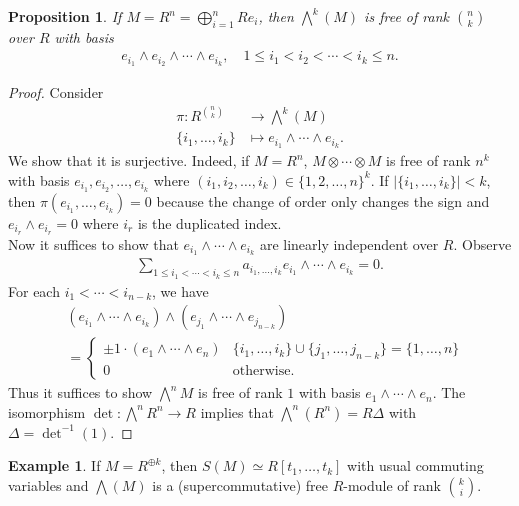 \documentclass[12pt]{report}
\theoremstyle{plain}
\newtheorem{proposition}[theorem]{Proposition}
\theoremstyle{remark}
\theoremstyle{definition}
\newtheorem{example}[theorem]{Example}
\begin{document}
\begin{proposition}
    If $M=R^n=\bigoplus_{i=1}^n Re_i$, then $\bigwedge^k(M)$ is free of rank ${n\choose k}$ over $R$ with basis
    \begin{align*}
        e_{i_1}\wedge e_{i_2}\wedge \cdots\wedge e_{i_k},\quad 1\le i_1<i_2<\cdots<i_k\le n.
    \end{align*}
\end{proposition}
\begin{proof}
    Consider
    \begin{align*}
        \pi:R^{n\choose k} &\to {\bigwedge}^k(M) \\
        \{i_1,\dots,i_k\} &\mapsto e_{i_1}\wedge \cdots \wedge e_{i_k}.
    \end{align*}
    We show that it is surjective. Indeed, if $M=R^n$, $M\otimes\cdots\otimes M$ is free of rank $n^k$ with basis $e_{i_1},e_{i_2},\dots,e_{i_k}$ where
    $(i_1,i_2,\dots,i_k)\in \{1,2,\dots,n\}^k$. If $|\{i_1,\dots,i_k\}|<k$, then $\pi(e_{i_1},\dots,e_{i_k})=0$ because the change of order only changes the sign and $e_{i_r}\wedge e_{i_r}=0$ where $i_r$ is the duplicated index.\\
    Now it suffices to show that $e_{i_1}\wedge\cdots\wedge e_{i_k}$ are linearly independent over $R$. Observe
    \begin{align*}
        \sum_{1\le i_1<\cdots<i_k\le n} a_{i_1,\dots,i_k} e_{i_1}\wedge\cdots\wedge e_{i_k}=0.
    \end{align*}
    For each $i_1<\cdots<i_{n-k}$, we have
    \begin{align*}
        &(e_{i_1}\wedge \cdots\wedge e_{i_k})\wedge (e_{j_1}\wedge\cdots\wedge e_{j_{n-k}})\\
        &=\begin{cases}
            \pm 1\cdot (e_1\wedge \cdots\wedge e_n) & \{i_1,\dots,i_k\}\cup \{j_1,\dots,j_{n-k}\}=\{1,\dots,n\} \\
            0 & \text{otherwise}.
        \end{cases}
    \end{align*}
    Thus it suffices to show $\bigwedge^n M$ is free of rank $1$ with basis $e_1\wedge \cdots\wedge e_n$. The isomorphism $\det:\bigwedge^n R^n\to R$ implies that $\bigwedge^n (R^n)=R\Delta$ with $\Delta=\det^{-1}(1)$.
\end{proof}

\begin{example}
    If $M=R^{\oplus k}$, then $S(M)\simeq R[t_1,\dots,t_k]$ with usual commuting variables and $\bigwedge(M)$ is a (supercommutative) free $R$-module of rank $k\choose i$.
\end{example}
\end{document}

